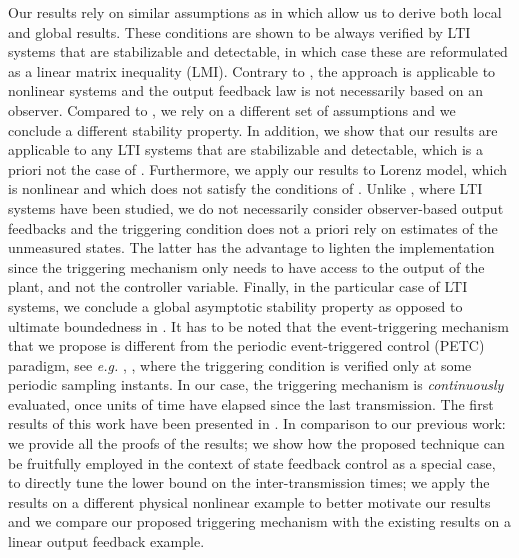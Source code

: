 \documentclass[a4paper, 9pt, twocolumn]{IEEEtran}
\theoremstyle{plain}
\theoremstyle{definition}
\begin{document}
Our results rely on similar assumptions as in \cite{Nesic2009explicit} which allow us to derive both local and global results. These conditions are shown to be always verified by LTI systems that are stabilizable and detectable, in which case these are reformulated as a linear matrix inequality (LMI). Contrary to \cite{Forni2014event}, the approach is applicable to nonlinear systems and the output feedback law is not necessarily based on an observer. Compared to \cite{Yu2012event}, we rely on a different set of assumptions and we conclude a different stability property. In addition, we show that our results are applicable to any LTI systems that are stabilizable and detectable, which is a priori not the case of \cite{Yu2012event}. Furthermore, we apply our results to Lorenz model, which is nonlinear and which does not satisfy the conditions of \cite{Yu2012event}. Unlike \cite{Tallapragada2012event-CDC}, where LTI systems have been studied, we do not necessarily consider observer-based output feedbacks and the triggering condition does not a priori rely on estimates of the unmeasured states. The latter has the advantage to lighten the implementation since the triggering mechanism only needs to have access to the output of the plant, and not the controller variable. Finally, in the particular case of LTI systems, we conclude a global asymptotic stability property as opposed to ultimate boundedness in \cite{Donkers2012output}. It has to be noted that the event-triggering mechanism that we propose is different from the periodic event-triggered control (PETC) paradigm, see \textit{e.g.} \cite{Heemels2013PETC}, \cite{Romain2013periodic}, where the triggering condition is verified only at some periodic sampling instants. In our case, the triggering mechanism is \textit{continuously} evaluated, once  units of time have elapsed since the last transmission. The first results of this work have been presented in \cite{Abdelrahim2014stabilization}. In comparison to our previous work: we provide all the proofs of the results; we show how the proposed technique can be fruitfully employed in the context of state feedback control as a special case, to directly tune the lower bound on the inter-transmission times; we apply the results on a different physical nonlinear example to better motivate our results and we compare our proposed triggering mechanism with the existing results on a linear output feedback example.
\end{document}

